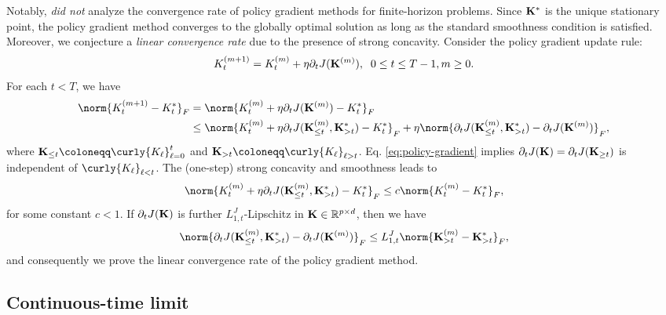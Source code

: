 \documentclass{article}
\newcommand{\R}{\mathbb{R}}
\begin{document}
{\color{black}
Notably, \citet{bhandari2024global} {\it did not} analyze the convergence rate of policy gradient methods for finite-horizon problems.
Since $ {\bf K}^{*} $ is the unique stationary point, the policy gradient method converges to the globally optimal solution as long as the standard smoothness condition is satisfied. Moreover, we conjecture a {\it linear convergence rate} due to the presence of strong concavity. Consider the policy gradient update rule:
\begin{align*}
    K_t^{(m+1)} = K_t^{(m)} + \eta \partial_t J({\bf K}^{(m)}),  \;\; 0 \leq t \leq T - 1, m \geq 0.
\end{align*}
For each $t < T$, we have
\begin{align*}
    \norm{K_t^{(m+1)} - K_t^*}_F  & = \norm{K_t^{(m)} + \eta \partial_t J({\bf K}^{(m)})  - K_t^*}_F \\ &  \leq \norm{K_t^{(m)} + \eta \partial_t J({\bf K}_{\leq t}^{(m)}, {\bf K}_{> t}^{*})  - K_t^*}_F  + \eta\norm{\partial_t J({\bf K}_{\leq t}^{(m)}, {\bf K}_{> t}^{*}) - \partial_t J({\bf K}^{(m)})}_F,
\end{align*}
where ${\bf K}_{\leq t} \coloneqq \curly{K_\ell}_{\ell=0}^t$ and ${\bf K}_{> t} \coloneqq \curly{K_\ell}_{\ell >t}$.
Eq. \eqref{eq:policy-gradient} implies $\partial_t J({\bf K}) = \partial_t J({\bf K}_{\geq t})$ is independent of $\curly{K_\ell}_{\ell < t}$. The (one-step) strong concavity and smoothness leads to 
\begin{align*}
  \norm{K_t^{(m)} + \eta \partial_t J({\bf K}_{\leq t}^{(m)}, {\bf K}_{> t}^{*})  - K_t^*}_F \leq c \norm{K_t^{(m)} - K_t^*}_F,
\end{align*}
for some constant $c<1$. 
If $\partial_t J(\bf K)$ is further $L_{1,t}^J$-Lipschitz in ${\bf K} \in \R^{p \times d}$, then we have
\begin{align*}
   \norm{\partial_t J({\bf K}_{\leq t}^{(m)}, {\bf K}_{> t}^{*}) - \partial_t J({\bf K}^{(m)})}_F 
   \leq L_{1, t}^J \norm{{\bf K}_{> t}^{(m)} - {\bf K}_{> t}^{*}}_F,
\end{align*}
and consequently we prove the linear convergence rate of the policy gradient method.} 


\subsection{Continuous-time limit}

\end{document}
